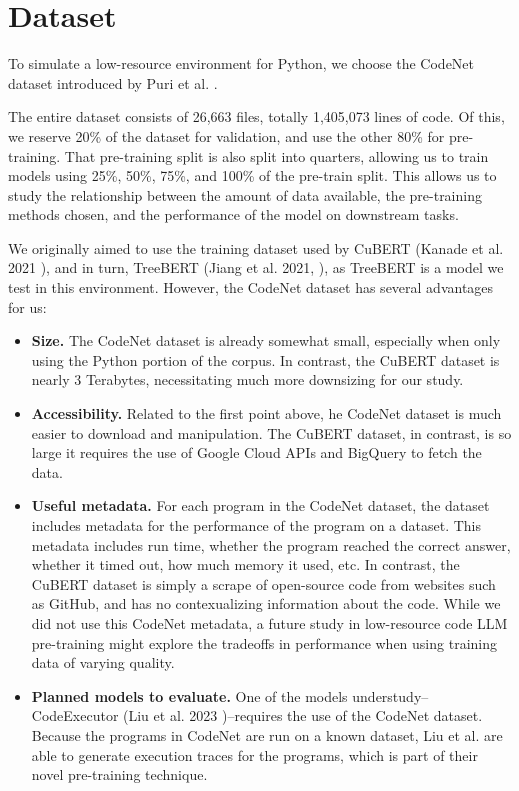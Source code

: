 \documentclass[acmlarge]{acmart}
\begin{document}
\section{Dataset}

To simulate a low-resource environment for Python, we choose the CodeNet dataset introduced by Puri et al. \cite{CodeNet}.

The entire dataset consists of 26,663 files, totally 1,405,073 lines of code. Of this, we reserve 20\% of the dataset for validation, and use the other 80\% for pre-training. That pre-training split is also split into quarters, allowing us to train models using 25\%, 50\%, 75\%, and 100\% of the pre-train split. 
This allows us to study the relationship between the amount of data available, the pre-training methods chosen, and the performance of the model on downstream tasks.

We originally aimed to use the training dataset used by CuBERT (Kanade et al. 2021 \cite{CuBERT}), and in turn, TreeBERT (Jiang et al. 2021, \cite{CuBERT}), as TreeBERT is a model we test in this environment. However, the CodeNet dataset has several advantages for us:

\begin{itemize}
    \item \textbf{Size.} The CodeNet dataset is already somewhat small, especially when only using the Python portion of the corpus. In contrast, the CuBERT dataset is nearly 3 Terabytes, necessitating much more downsizing for our study.
    \item \textbf{Accessibility.} Related to the first point above, he CodeNet dataset is much easier to download and manipulation. The CuBERT dataset, in contrast, is so large it requires the use of Google Cloud APIs and BigQuery to fetch the data.
    \item \textbf{Useful metadata.} For each program in the CodeNet dataset, the dataset includes metadata for the performance of the program on a dataset. This metadata includes run time, whether the program reached the correct answer, whether it timed out, how much memory it used, etc. In contrast, the CuBERT dataset is simply a scrape of open-source code from websites such as GitHub, and has no contexualizing information about the code. While we did not use this CodeNet metadata, a future study in low-resource code LLM pre-training might explore the tradeoffs in performance when using training data of varying quality.
    \item \textbf{Planned models to evaluate.} One of the models understudy--CodeExecutor (Liu et al. 2023 \cite{CodeExecutor})--requires the use of the CodeNet dataset. Because the programs in CodeNet are run on a known dataset, Liu et al. are able to generate execution traces for the programs, which is part of their novel pre-training technique.
\end{itemize}
\end{document}
